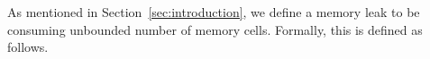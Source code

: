 %

As mentioned in Section~\ref{sec:introduction}, we define a memory
leak to be consuming unbounded number of memory cells.  Formally, this
is defined as follows.


